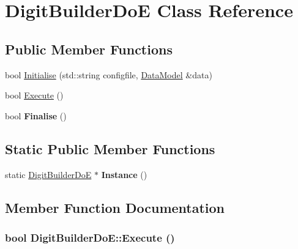 \hypertarget{classDigitBuilderDoE}{
\section{DigitBuilderDoE Class Reference}
\label{classDigitBuilderDoE}
}
\subsection*{Public Member Functions}
\begin{DoxyCompactItemize}
\item 
bool \hyperlink{classDigitBuilderDoE_a629487cb173c306f7796d4466049d790}{Initialise} (std::string configfile, \hyperlink{classDataModel}{DataModel} \&data)
\item 
bool \hyperlink{classDigitBuilderDoE_abbf2b8912d5a5e01c8755ad873e99520}{Execute} ()
\item 
\hypertarget{classDigitBuilderDoE_ad51a7fbe29242cd5f5283a0e1a488798}{
bool {\bfseries Finalise} ()}
\label{classDigitBuilderDoE_ad51a7fbe29242cd5f5283a0e1a488798}

\end{DoxyCompactItemize}
\subsection*{Static Public Member Functions}
\begin{DoxyCompactItemize}
\item 
\hypertarget{classDigitBuilderDoE_ae6f5d12e2b1c6a3a57097ab946add570}{
static \hyperlink{classDigitBuilderDoE}{DigitBuilderDoE} $\ast$ {\bfseries Instance} ()}
\label{classDigitBuilderDoE_ae6f5d12e2b1c6a3a57097ab946add570}

\end{DoxyCompactItemize}


\subsection{Member Function Documentation}
\hypertarget{classDigitBuilderDoE_abbf2b8912d5a5e01c8755ad873e99520}{
\subsubsection[{Execute}]{\setlength{\rightskip}{0pt plus 5cm}bool DigitBuilderDoE::Execute ()}}
\label{classDigitBuilderDoE_abbf2b8912d5a5e01c8755ad873e99520}


